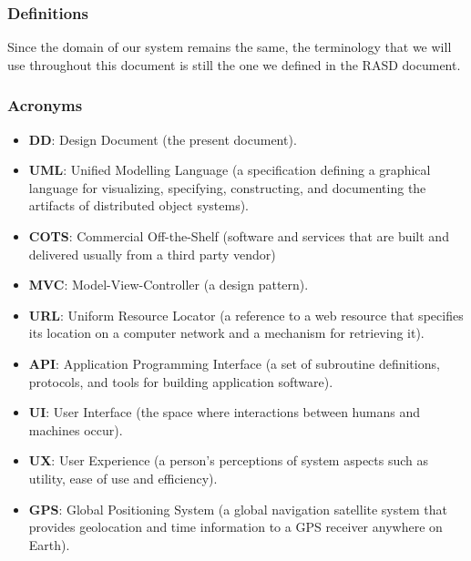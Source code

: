 \subsubsection{Definitions}

Since the domain of our system remains the same, the terminology that we will use throughout this document is still the one we defined in the RASD document.

\subsubsection{Acronyms}

\begin{itemize}
\item \textbf{DD}: Design Document (the present document).
\item \textbf{UML}: Unified Modelling Language (a specification defining a graphical language for visualizing, specifying, constructing, and documenting the artifacts of distributed object systems).
\item \textbf{COTS}: Commercial Off-the-Shelf (software and services that are built and delivered usually from a third party vendor)
\item \textbf{MVC}: Model-View-Controller (a design pattern).
\item \textbf{URL}: Uniform Resource Locator (a reference to a web resource that specifies its location on a computer network and a mechanism for retrieving it).
\item \textbf{API}: Application Programming Interface (a set of subroutine definitions, protocols, and tools for building application software).
\item \textbf{UI}: User Interface (the space where interactions between humans and machines occur).
\item \textbf{UX}: User Experience (a person’s perceptions of system aspects such as utility, ease of use and efficiency).
\item \textbf{GPS}: Global Positioning System (a global navigation satellite system that provides geolocation and time information to a GPS receiver anywhere on Earth).
\end{itemize}


